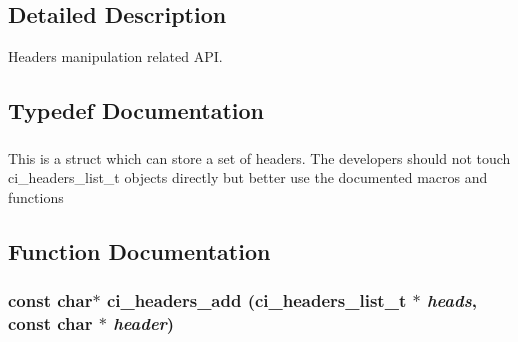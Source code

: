 \subsection{Detailed Description}
Headers manipulation related API. 

\subsection{Typedef Documentation}
\hypertarget{group__HEADERS_gaaa203ac92dd0242ab66f4237548d7260}{
\subsubsection[{ci\_\-headers\_\-list\_\-t}]{}}
\label{group__HEADERS_gaaa203ac92dd0242ab66f4237548d7260}


This is a struct which can store a set of headers. The developers should not touch ci\_\-headers\_\-list\_\-t objects directly but better use the documented macros and functions 

\subsection{Function Documentation}
\hypertarget{group__HEADERS_gac2762a25d8931a4accdef1be4bd57217}{
\subsubsection[{ci\_\-headers\_\-add}]{\setlength{\rightskip}{0pt plus 5cm}const char$\ast$ ci\_\-headers\_\-add ({\bf ci\_\-headers\_\-list\_\-t} $\ast$ {\em heads}, \/  const char $\ast$ {\em header})}}
\label{group__HEADERS_gac2762a25d8931a4accdef1be4bd57217}


